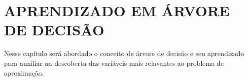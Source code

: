 \chapter{APRENDIZADO EM ÁRVORE DE DECISÃO}
\label{cap:dectree}

Nesse capítulo será abordado o conceito de árvore de decisão e seu aprendizado para auxiliar na descoberta das variáveis mais relavantes ao problema de aproximação.
